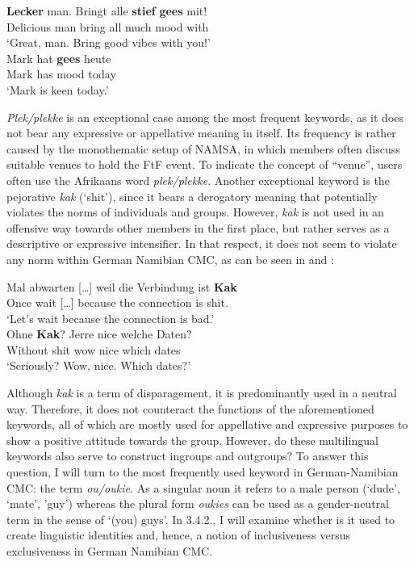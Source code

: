 \documentclass[output=paper]{langsci/langscibook}
\begin{document}
\ea
\label{ex:radke:7}
 \gll \textbf{Lecker} man. Bringt alle \textbf{stief} \textbf{gees} mit! \\
   		Delicious man bring all much mood with\\
     	\glt `Great, man. Bring good vibes with you!'\\
\ex\label{ex:radke:8}
	\gll Mark hat \textbf{gees} heute \\
		Mark has mood today\\
     \glt `Mark is keen today.' \\
\z
 
\textit{Plek/plekke} is an exceptional case among the most frequent keywords, as it does not bear any expressive or appellative meaning in itself. Its frequency is rather caused by the monothematic setup of NAMSA, in which members often discuss suitable venues to hold the FtF event. To indicate the concept of “venue”, users often use the Afrikaans word \textit{plek/plekke}. Another exceptional keyword is the pejorative \textit{kak} (‘shit’), since it bears a derogatory meaning that potentially violates the norms of individuals and groups. However, \textit{kak} is not used in an offensive way towards other members in the first place, but rather serves as a descriptive or expressive intensifier. In that respect, it does not seem to violate any norm within German Namibian CMC, as can be seen in  and :

\ea\label{ex:radke:9}
	\gll Mal abwarten […] weil die Verbindung ist \textbf{Kak}\\
		Once wait […] because the connection is shit.\\
	\glt `Let’s wait because the connection is bad.'\\
\ex\label{ex:radke:10}
	\gll Ohne \textbf{Kak}? Jerre nice welche Daten? \\
		Without shit wow nice which dates\\
	\glt `Seriously? Wow, nice. Which dates?'\\
\z

Although \textit{kak} is a term of disparagement, it is predominantly used in a neutral way. Therefore, it does not counteract the functions of the aforementioned keywords, all of which are mostly used for appellative and expressive purposes to show a positive attitude towards the group. However, do these multilingual keywords also serve to construct ingroups and outgroups? To answer this question, I will turn to the most frequently used keyword in German-Namibian CMC: the term \textit{ou/oukie.} As a singular noun it refers to a male person (‘dude’, ‘mate’, ’guy’) whereas the plural form \textit{oukies} can be used as a gender-neutral term in the sense of ‘(you) guys’. In 3.4.2., I will examine whether is it used to create linguistic identities and, hence, a notion of inclusiveness versus exclusiveness in German Namibian CMC.
\end{document}
